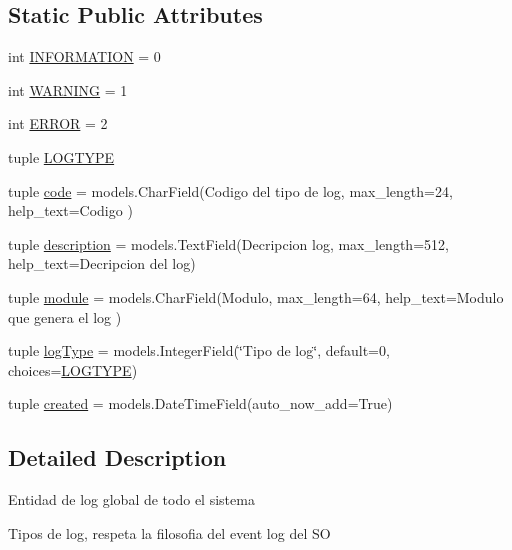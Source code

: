 \subsection*{Static Public Attributes}
\begin{DoxyCompactItemize}
\item 
int \hyperlink{class_ground_segment_1_1models_1_1_log_1_1_log_ac016eb00e329747a1632e3109e7e7426}{I\+N\+F\+O\+R\+M\+A\+T\+I\+O\+N} = 0
\item 
int \hyperlink{class_ground_segment_1_1models_1_1_log_1_1_log_a36e7a5112aeccaa699704764d43e46dd}{W\+A\+R\+N\+I\+N\+G} = 1
\item 
int \hyperlink{class_ground_segment_1_1models_1_1_log_1_1_log_a2a3ccda2ab71251c423d1ca45863f699}{E\+R\+R\+O\+R} = 2
\item 
tuple \hyperlink{class_ground_segment_1_1models_1_1_log_1_1_log_ab1692e268594b524bb18dd71c2542ea1}{L\+O\+G\+T\+Y\+P\+E}
\item 
tuple \hyperlink{class_ground_segment_1_1models_1_1_log_1_1_log_ae8de250667b9b871ac02617cae717eef}{code} = models.\+Char\+Field(\textquotesingle{}Codigo del tipo de log\textquotesingle{}, max\+\_\+length=24, help\+\_\+text=\textquotesingle{}Codigo\textquotesingle{} )
\item 
tuple \hyperlink{class_ground_segment_1_1models_1_1_log_1_1_log_aec39855e51031089ade633107205980c}{description} = models.\+Text\+Field(\textquotesingle{}Decripcion log\textquotesingle{}, max\+\_\+length=512, help\+\_\+text=\textquotesingle{}Decripcion del log\textquotesingle{})
\item 
tuple \hyperlink{class_ground_segment_1_1models_1_1_log_1_1_log_a641912d76965a5802c808ca609194bf2}{module} = models.\+Char\+Field(\textquotesingle{}Modulo\textquotesingle{}, max\+\_\+length=64, help\+\_\+text=\textquotesingle{}Modulo que genera el log\textquotesingle{} )
\item 
tuple \hyperlink{class_ground_segment_1_1models_1_1_log_1_1_log_a71704dacd9c83ffc71076bb1e05293fd}{log\+Type} = models.\+Integer\+Field(\char`\"{}Tipo de log\char`\"{}, default=0, choices=\hyperlink{class_ground_segment_1_1models_1_1_log_1_1_log_ab1692e268594b524bb18dd71c2542ea1}{L\+O\+G\+T\+Y\+P\+E})
\item 
tuple \hyperlink{class_ground_segment_1_1models_1_1_log_1_1_log_acb07a0dee966edc415ff1e5edd2d44cb}{created} = models.\+Date\+Time\+Field(auto\+\_\+now\+\_\+add=True)
\end{DoxyCompactItemize}


\subsection{Detailed Description}
\begin{DoxyVerb}Entidad de log global de todo el sistema    
\end{DoxyVerb}
\begin{DoxyVerb}Tipos de log, respeta la filosofia del event log del SO
\end{DoxyVerb}
 

